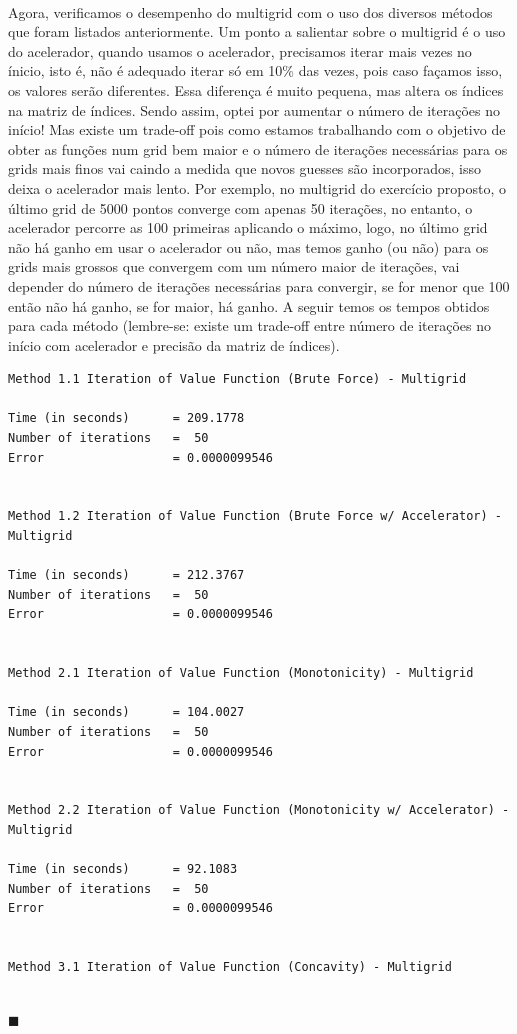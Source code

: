 \documentclass[10pt]{article}
\newcommand*{\QEDA}{\hfill\ensuremath{\blacksquare}}%
\newcommand\0{\mathbf{0}}
\newenvironment{sol}
    {\\[1em] {\color{magenta}\text{Resposta.}}
    }
    {{\color{blue!50!black}\QEDA}}
\begin{document}
\begin{enumerate}[wide]
\begin{sol}
\newpage

Agora, verificamos o desempenho do multigrid com o uso dos diversos métodos que foram listados anteriormente. Um ponto a salientar sobre o multigrid é o uso do acelerador, quando usamos o acelerador, precisamos iterar mais vezes no ínicio, isto é, não é adequado iterar só em 10\% das vezes, pois caso façamos isso, os valores serão diferentes. Essa diferença é muito pequena, mas altera os índices na matriz de índices. Sendo assim, optei por aumentar o número de iterações no início! Mas existe um trade-off pois como estamos trabalhando com o objetivo de obter as funções num grid bem maior e o número de iterações necessárias para os grids mais finos vai caindo a medida que novos guesses são incorporados, isso deixa o acelerador mais lento. Por exemplo, no multigrid do exercício proposto, o último grid de 5000 pontos converge com apenas 50 iterações, no entanto, o acelerador percorre as 100 primeiras aplicando o máximo, logo, no último grid não há ganho em usar o acelerador ou não, mas temos ganho (ou não) para os grids mais grossos que convergem com um número maior de iterações, vai depender do número de iterações necessárias para convergir, se for menor que 100 então não há ganho, se for maior, há ganho. A seguir temos os tempos obtidos para cada método (lembre-se: existe um trade-off entre número de iterações no início com acelerador e precisão da matriz de índices).

\begin{lstlisting}
Method 1.1 Iteration of Value Function (Brute Force) - Multigrid

Time (in seconds)      = 209.1778 
Number of iterations   =  50 
Error                  = 0.0000099546 


Method 1.2 Iteration of Value Function (Brute Force w/ Accelerator) - Multigrid

Time (in seconds)      = 212.3767 
Number of iterations   =  50 
Error                  = 0.0000099546 


Method 2.1 Iteration of Value Function (Monotonicity) - Multigrid

Time (in seconds)      = 104.0027 
Number of iterations   =  50 
Error                  = 0.0000099546 


Method 2.2 Iteration of Value Function (Monotonicity w/ Accelerator) - Multigrid

Time (in seconds)      = 92.1083 
Number of iterations   =  50 
Error                  = 0.0000099546 


Method 3.1 Iteration of Value Function (Concavity) - Multigrid


\end{lstlisting}
\end{sol}
\end{enumerate}
\end{document}
